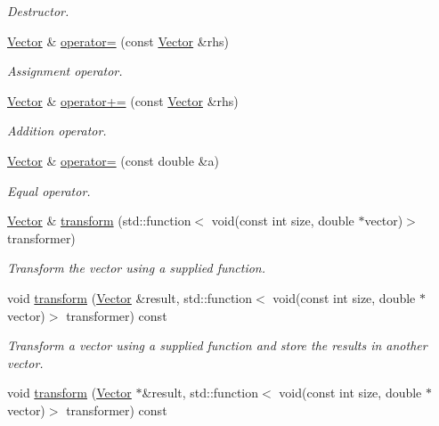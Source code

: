 \begin{DoxyCompactItemize}
\begin{DoxyCompactList}\small\item\em Destructor. \end{DoxyCompactList}\item 
\hyperlink{class_c_a_r_o_m_1_1_vector}{Vector} \& \hyperlink{class_c_a_r_o_m_1_1_vector_a77b17dde248f3c532ac31dcf9632e9c4}{operator=} (const \hyperlink{class_c_a_r_o_m_1_1_vector}{Vector} \&rhs)
\begin{DoxyCompactList}\small\item\em Assignment operator. \end{DoxyCompactList}\item 
\hyperlink{class_c_a_r_o_m_1_1_vector}{Vector} \& \hyperlink{class_c_a_r_o_m_1_1_vector_a4c92d8b8a9c156ff394cf87d4079fa99}{operator+=} (const \hyperlink{class_c_a_r_o_m_1_1_vector}{Vector} \&rhs)
\begin{DoxyCompactList}\small\item\em Addition operator. \end{DoxyCompactList}\item 
\hyperlink{class_c_a_r_o_m_1_1_vector}{Vector} \& \hyperlink{class_c_a_r_o_m_1_1_vector_aa0a74e908e55dc1610a30db1adeb40b4}{operator=} (const double \&a)
\begin{DoxyCompactList}\small\item\em Equal operator. \end{DoxyCompactList}\item 
\hyperlink{class_c_a_r_o_m_1_1_vector}{Vector} \& \hyperlink{class_c_a_r_o_m_1_1_vector_aee8568a55c608718bf2d50031f1cf8dc}{transform} (std\-::function$<$ void(const int size, double $\ast$vector)$>$ transformer)
\begin{DoxyCompactList}\small\item\em Transform the vector using a supplied function. \end{DoxyCompactList}\item 
void \hyperlink{class_c_a_r_o_m_1_1_vector_a85ea01ef440ba43b0cf02aaecb2992ff}{transform} (\hyperlink{class_c_a_r_o_m_1_1_vector}{Vector} \&result, std\-::function$<$ void(const int size, double $\ast$vector)$>$ transformer) const 
\begin{DoxyCompactList}\small\item\em Transform a vector using a supplied function and store the results in another vector. \end{DoxyCompactList}\item 
void \hyperlink{class_c_a_r_o_m_1_1_vector_a6d54faa937164e349f6cd99eb8c360c3}{transform} (\hyperlink{class_c_a_r_o_m_1_1_vector}{Vector} $\ast$\&result, std\-::function$<$ void(const int size, double $\ast$vector)$>$ transformer) const 

\end{DoxyCompactItemize}
